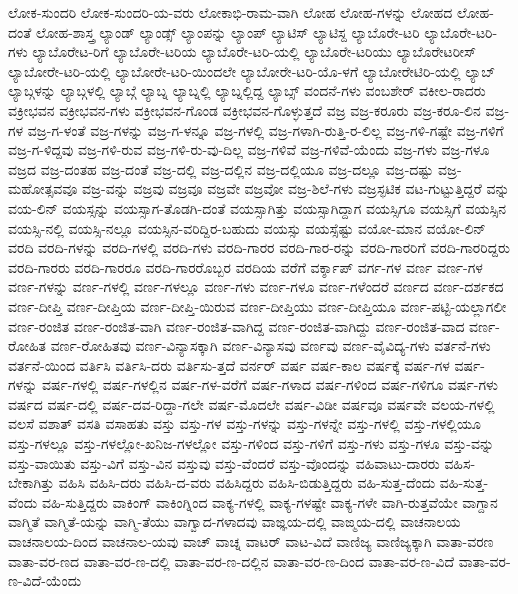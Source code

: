{ಲೋಕ-ಸುಂದರಿ
ಲೋಕ-ಸುಂದರಿ-ಯ-ವರು
ಲೋಕಾಭಿ-ರಾಮ-ವಾಗಿ
ಲೋಹ
ಲೋಹ-ಗಳನ್ನು
ಲೋಹದ
ಲೋಹ-ದಂತೆ
ಲೋಹ-ಶಾಸ್ತ್ರ
ಲ್ಯಾಂಡ್
ಲ್ಯಾಂಡ್ಸ್
ಲ್ಯಾಂಪನ್ನು
ಲ್ಯಾಂಪ್
ಲ್ಯಾಟಿಸ್
ಲ್ಯಾಟಿಸ್ದ
ಲ್ಯಾಬೊರೇ-ಟರಿ
ಲ್ಯಾಬೊರೇ-ಟರಿ-ಗಳು
ಲ್ಯಾಬೊರೇಟ-ರಿಗೆ
ಲ್ಯಾಬೊರೇ-ಟರಿಯ
ಲ್ಯಾಬೊರೇ-ಟರಿ-ಯಲ್ಲಿ
ಲ್ಯಾಬೊರೇ-ಟರಿಯು
ಲ್ಯಾಬೊರೇಟರೀಸ್
ಲ್ಯಾಬೋರೇ-ಟರಿ-ಯಲ್ಲಿ
ಲ್ಯಾಬೋರೇ-ಟರಿ-ಯಿಂದಲೇ
ಲ್ಯಾಬೋರೇ-ಟರಿ-ಯೊ-ಳಗೆ
ಲ್ಯಾಬೋರೇಟಿರಿ-ಯಲ್ಲಿ
ಲ್ಯಾಬ್
ಲ್ಯಾಬ್ಗಳನ್ನು
ಲ್ಯಾಬ್ಗಳಲ್ಲಿ
ಲ್ಯಾಬ್ಗೆ
ಲ್ಯಾಬ್ನ
ಲ್ಯಾಬ್ನಲ್ಲಿ
ಲ್ಯಾಬ್ನಲ್ಲಿದ್ದ
ಲ್ಯಾಬ್ಸ್
ವಂದನೆ-ಗಳು
ವಂಬಶೇರ್
ವಕೀಲ-ರಾದರು
ವಕ್ರೀಭವನ
ವಕ್ರೀಭವನ-ಗಳು
ವಕ್ರೀಭವನ-ಗೊಂಡ
ವಕ್ರೀಭವನ-ಗೊಳ್ಳುತ್ತದೆ
ವಜ್ರ
ವಜ್ರ-ಕರೂರು
ವಜ್ರ-ಕರೂ-ಲಿನ
ವಜ್ರ-ಗಳ
ವಜ್ರ-ಗ-ಳಂತೆ
ವಜ್ರ-ಗಳನ್ನು
ವಜ್ರ-ಗ-ಳನ್ನೂ
ವಜ್ರ-ಗಳಲ್ಲಿ
ವಜ್ರ-ಗಳಾಗಿ-ರುತ್ತಿ-ರ-ಲಿಲ್ಲ
ವಜ್ರ-ಗಳಿ-ಗಷ್ಟೇ
ವಜ್ರ-ಗಳಿಗೆ
ವಜ್ರ-ಗ-ಳಿದ್ದವು
ವಜ್ರ-ಗಳಿ-ರುವ
ವಜ್ರ-ಗಳಿ-ರು-ವು-ದಿಲ್ಲ
ವಜ್ರ-ಗಳಿವೆ
ವಜ್ರ-ಗಳಿವೆ-ಯೆಂದು
ವಜ್ರ-ಗಳು
ವಜ್ರ-ಗಳೂ
ವಜ್ರದ
ವಜ್ರ-ದಂತಹ
ವಜ್ರ-ದಂತೆ
ವಜ್ರ-ದಲ್ಲಿ
ವಜ್ರ-ದಲ್ಲಿನ
ವಜ್ರ-ದಲ್ಲಿಯೂ
ವಜ್ರ-ದಲ್ಲೂ
ವಜ್ರ-ದಷ್ಟು
ವಜ್ರ-ಮಹೋತ್ಸವವೂ
ವಜ್ರ-ವನ್ನು
ವಜ್ರವು
ವಜ್ರವೂ
ವಜ್ರವೇ
ವಜ್ರವೋ
ವಜ್ರ-ಶಿಲೆ-ಗಳು
ವಜ್ರಸ್ಫಟಿಕ
ವಟ-ಗುಟ್ಟುತ್ತಿದ್ದರೆ
ವನ್ನು
ವಯ-ಲಿನ್
ವಯಸ್ಸನ್ನು
ವಯಸ್ಸಾಗ-ತೊಡಗಿ-ದಂತೆ
ವಯಸ್ಸಾಗಿತ್ತು
ವಯಸ್ಸಾಗಿದ್ದಾಗ
ವಯಸ್ಸಿಗೂ
ವಯಸ್ಸಿಗೆ
ವಯಸ್ಸಿನ
ವಯಸ್ಸಿ-ನಲ್ಲಿ
ವಯಸ್ಸಿ-ನಲ್ಲೂ
ವಯಸ್ಸಿನ-ವರಿದ್ದಿರ-ಬಹುದು
ವಯಸ್ಸು
ವಯಸ್ಸೆಷ್ಟು
ವಯೋ-ಮಾನ
ವಯೋ-ಲಿನ್
ವರದಿ
ವರದಿ-ಗಳನ್ನು
ವರದಿ-ಗಳಲ್ಲಿ
ವರದಿ-ಗಳು
ವರದಿ-ಗಾರರ
ವರದಿ-ಗಾರ-ರನ್ನು
ವರದಿ-ಗಾರರಿಗೆ
ವರದಿ-ಗಾರರಿದ್ದರು
ವರದಿ-ಗಾರರು
ವರದಿ-ಗಾರರೂ
ವರದಿ-ಗಾರರೊಬ್ಬರ
ವರದಿಯ
ವರೆಗೆ
ವರ್ಕ್ಶಾಪ್
ವರ್ಗ-ಗಳ
ವರ್ಣ
ವರ್ಣ-ಗಳ
ವರ್ಣ-ಗಳನ್ನು
ವರ್ಣ-ಗಳಲ್ಲಿ
ವರ್ಣ-ಗಳಲ್ಲೂ
ವರ್ಣ-ಗಳು
ವರ್ಣ-ಗಳೂ
ವರ್ಣ-ಗಳೆಂದರೆ
ವರ್ಣದ
ವರ್ಣ-ದರ್ಶಕದ
ವರ್ಣ-ದೀಪ್ತಿ
ವರ್ಣ-ದೀಪ್ತಿಯ
ವರ್ಣ-ದೀಪ್ತಿ-ಯಿರುವ
ವರ್ಣ-ದೀಪ್ತಿಯು
ವರ್ಣ-ದೀಪ್ತಿಯೂ
ವರ್ಣ-ಪಟ್ಟಿ-ಯಲ್ಲಾಗಲೀ
ವರ್ಣ-ರಂಜಿತ
ವರ್ಣ-ರಂಜಿತ-ವಾಗಿ
ವರ್ಣ-ರಂಜಿತ-ವಾಗಿದ್ದ
ವರ್ಣ-ರಂಜಿತ-ವಾಗಿದ್ದು
ವರ್ಣ-ರಂಜಿತ-ವಾದ
ವರ್ಣ-ರೋಹಿತ
ವರ್ಣ-ರೋಹಿತವು
ವರ್ಣ-ವಿನ್ಯಾಸಕ್ಕಾಗಿ
ವರ್ಣ-ವಿನ್ಯಾಸವು
ವರ್ಣವು
ವರ್ಣ-ವೈವಿದ್ಯ-ಗಳು
ವರ್ತನೆ-ಗಳು
ವರ್ತನೆ-ಯಿಂದ
ವರ್ತಿಸಿ
ವರ್ತಿಸಿ-ದರು
ವರ್ತಿಸು-ತ್ತದೆ
ವರ್ನರ್
ವರ್ಷ
ವರ್ಷ-ಕಾಲ
ವರ್ಷಕ್ಕೆ
ವರ್ಷ-ಗಳ
ವರ್ಷ-ಗಳನ್ನು
ವರ್ಷ-ಗಳಲ್ಲಿ
ವರ್ಷ-ಗಳಲ್ಲಿನ
ವರ್ಷ-ಗಳ-ವರೆಗೆ
ವರ್ಷ-ಗಳಾದ
ವರ್ಷ-ಗಳಿಂದ
ವರ್ಷ-ಗಳಿಗೂ
ವರ್ಷ-ಗಳು
ವರ್ಷದ
ವರ್ಷ-ದಲ್ಲಿ
ವರ್ಷ-ದವ-ರಿದ್ದಾ-ಗಲೇ
ವರ್ಷ-ಮೊದಲೇ
ವರ್ಷ-ವಿಡೀ
ವರ್ಷವೂ
ವರ್ಷವೇ
ವಲಯ-ಗಳಲ್ಲಿ
ವಲಸೆ
ವಶಾತ್
ವಸತಿ
ವಸಾಹತು
ವಸ್ತು
ವಸ್ತು-ಗಳ
ವಸ್ತು-ಗಳನ್ನು
ವಸ್ತು-ಗಳನ್ನೇ
ವಸ್ತು-ಗಳಲ್ಲಿ
ವಸ್ತು-ಗಳಲ್ಲಿಯೂ
ವಸ್ತು-ಗಳಲ್ಲೂ
ವಸ್ತು-ಗಳಲ್ಲೋ-ಖನಿಜ-ಗಳಲ್ಲೋ
ವಸ್ತು-ಗಳಿಂದ
ವಸ್ತು-ಗಳಿಗೆ
ವಸ್ತು-ಗಳು
ವಸ್ತು-ಗಳೂ
ವಸ್ತು-ವನ್ನು
ವಸ್ತು-ವಾಯಿತು
ವಸ್ತು-ವಿಗೆ
ವಸ್ತು-ವಿನ
ವಸ್ತುವು
ವಸ್ತು-ವೆಂದರೆ
ವಸ್ತು-ವೊಂದನ್ನು
ವಹಿವಾಟು-ದಾರರು
ವಹಿಸ-ಬೇಕಾಗಿತ್ತು
ವಹಿಸಿ
ವಹಿಸಿ-ದರು
ವಹಿಸಿ-ದ-ವರು
ವಹಿಸಿದ್ದರು
ವಹಿಸಿ-ಬಿಡುತ್ತಿದ್ದರು
ವಹಿ-ಸುತ್ತ-ದೆಂದು
ವಹಿ-ಸುತ್ತ-ವೆಂದು
ವಹಿ-ಸುತ್ತಿದ್ದರು
ವಾಕಿಂಗ್
ವಾಕಿಂಗ್ನಿಂದ
ವಾಕ್ಯ-ಗಳಲ್ಲಿ
ವಾಕ್ಯ-ಗಳಷ್ಟೇ
ವಾಕ್ಯ-ಗಳೇ
ವಾಗಿ-ರುತ್ತವೆಯೇ
ವಾಗ್ದಾನ
ವಾಗ್ಮಿತೆ
ವಾಗ್ಮಿತೆ-ಯನ್ನು
ವಾಗ್ಮಿ-ತೆಯು
ವಾಗ್ವಾದ-ಗಳಾದವು
ವಾಙ್ಞಯ-ದಲ್ಲಿ
ವಾಙ್ಮಯ-ದಲ್ಲಿ
ವಾಚನಾಲಯ
ವಾಚನಾಲಯ-ದಿಂದ
ವಾಚನಾಲ-ಯವು
ವಾಚ್
ವಾಚ್ನ
ವಾಟರ್
ವಾಟ-ವಿದೆ
ವಾಣಿಜ್ಯ
ವಾಣಿಜ್ಯಕ್ಕಾಗಿ
ವಾತಾ-ವರಣ
ವಾತಾ-ವರ-ಣದ
ವಾತಾ-ವರ-ಣ-ದಲ್ಲಿ
ವಾತಾ-ವರ-ಣ-ದಲ್ಲಿನ
ವಾತಾ-ವರ-ಣ-ದಿಂದ
ವಾತಾ-ವರ-ಣ-ವಿದೆ
ವಾತಾ-ವರ-ಣ-ವಿದೆ-ಯೆಂದು
}
